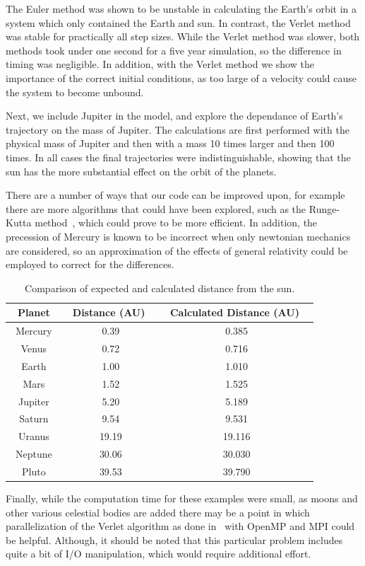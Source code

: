 \documentclass[prc,amsmath,twocolumn,superscriptaddress]{revtex4}
\begin{document}
The Euler method was shown to be unstable in calculating the Earth's orbit in a system which only contained the Earth and sun. In contrast, the Verlet method was stable for practically all step sizes. While the Verlet method was slower, both methods took under one second for a five year simulation, so the difference in timing was negligible. In addition, with the Verlet method we show the importance of the correct initial conditions, as too large of a velocity could cause the system to become unbound.

Next, we include Jupiter in the model, and explore the dependance of Earth's trajectory on the mass of Jupiter. The calculations are first performed with the physical mass of Jupiter and then with a mass 10 times larger and then 100 times. In all cases the final trajectories were indistinguishable, showing that the sun has the more substantial effect on the orbit of the planets.

There are a number of ways that our code can be improved upon, for example there are more algorithms that could have been explored, such as the Runge-Kutta method~\cite{RK}, which could prove to be more efficient. In addition, the precession of Mercury is known to be incorrect when only newtonian mechanics are considered, so an approximation of the effects of general relativity could be employed to correct for the differences.

\begin{table}[h]
\centering
\begin{tabular}{|c|c|c|}
\hline
Planet & ~Distance (AU) ~& ~Calculated Distance (AU) ~\\
\hline
Mercury&0.39 &0.385\\
Venus&0.72&0.716\\
Earth&1.00&1.010\\
Mars&1.52&1.525\\
Jupiter&5.20&5.189\\
Saturn&9.54&9.531 \\
Uranus&19.19&19.116\\
~Neptune~&30.06&30.030 \\
Pluto&39.53& 39.790\\
\hline
\end{tabular}
\caption{Comparison of expected and calculated distance from the sun.}
\label{comp}
\end{table}
 Finally, while the computation time for these examples were small, as moons and other various celestial bodies are added there may be a point in which parallelization of the Verlet algorithm as done in~\cite{omp} with OpenMP and MPI could be helpful. Although, it should be noted that this particular problem includes quite a bit of I/O manipulation, which would require additional effort.
\end{document}
